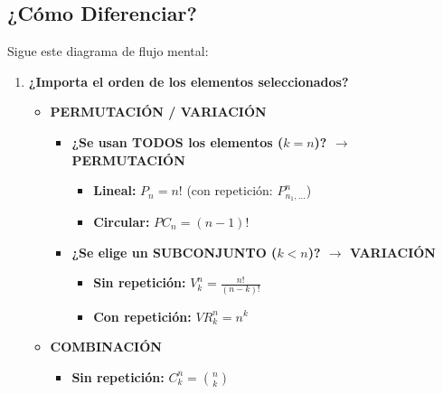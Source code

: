 \documentclass[12pt, letterpaper]{article}
\begin{document}
\subsection*{¿Cómo Diferenciar?}
Sigue este diagrama de flujo mental:
\begin{enumerate}[label=\bfseries Paso \arabic*:, wide]
	\item \textbf{¿Importa el orden de los elementos seleccionados?}
	      \begin{itemize}
		      \item[\bfseries Sí $\rightarrow$] \textbf{PERMUTACIÓN / VARIACIÓN}
		            \begin{itemize}
			            \item \textbf{¿Se usan TODOS los elementos ($k=n$)? $\rightarrow$ PERMUTACIÓN}
			                  \begin{itemize}
				                  \item \textbf{Lineal:} $P_n = n!$ (con repetición: $P_{n_1,\dots}^n$)
				                  \item \textbf{Circular:} $PC_n = (n-1)!$
			                  \end{itemize}
			            \item \textbf{¿Se elige un SUBCONJUNTO ($k<n$)? $\rightarrow$ VARIACIÓN}
			                  \begin{itemize}
				                  \item \textbf{Sin repetición:} $V_k^n = \frac{n!}{(n-k)!}$
				                  \item \textbf{Con repetición:} $VR_k^n = n^k$
			                  \end{itemize}
		            \end{itemize}
		      \item[\bfseries No $\rightarrow$] \textbf{COMBINACIÓN}
		            \begin{itemize}
			            \item \textbf{Sin repetición:} $C_k^n = \binom{n}{k}$
		            \end{itemize}
	      \end{itemize}
\end{enumerate}
\end{document}
